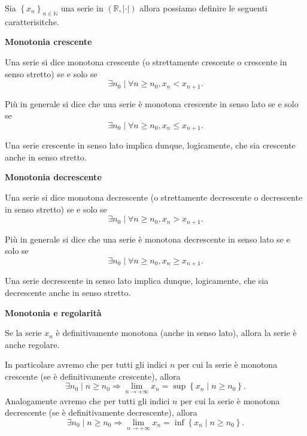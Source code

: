 Sia $\left\{x_n\right\}_{n\in\mathbb{N}}$ una serie in $\left(\mathbb{R},\left|\cdot\right|\right)$
allora possiamo definire le seguenti caratterisitche.


\begin{definition}
    \textbf{Monotonia crescente}

    Una serie si dice monotona crescente (o strettamente crescente o crescente in senso stretto)
    se e solo se
    \[
        \exists n_0 \mid \forall n \geq n_0, x_n<x_{n+1}.
    \]

    Più in generale si dice che una serie è monotona crescente in senso lato se e solo se
    \[
        \exists n_0 \mid \forall n \geq n_0, x_n\leq x_{n+1}.
    \]

    Una serie crescente in senso lato implica dunque, logicamente, che sia crescente
    anche in senso stretto.
\end{definition}

\begin{definition}
    \textbf{Monotonia decrescente}

    Una serie si dice monotona decrescente (o strettamente decrescente o decrescente in senso stretto)
    se e solo se
    \[
        \exists n_0 \mid \forall n \geq n_0, x_n>x_{n+1}.
    \]

    Più in generale si dice che una serie è monotona decrescente in senso lato se e solo se
    \[
        \exists n_0 \mid \forall n \geq n_0, x_n\geq x_{n+1}.
    \]

    Una serie decrescente in senso lato implica dunque, logicamente, che sia decrescente
    anche in senso stretto.
\end{definition}

\begin{theorem}\label{teo:mon-e-reg}
    \textbf{Monotonia e regolarità}

    Se la serie $x_n$ è definitivamente monotona (anche in senso lato), allora la serie è anche regolare.

    In particolare avremo che per tutti gli indici $n$ per cui la serie è
    monotona crescente (se è definitivamente crescente), allora
    \[
        \exists n_0 \mid n \geq n_0 \Rightarrow
        \underset{n\rightarrow+\infty}{\lim}x_n=\sup\left\{x_n\mid n \geq n_0\right\}.
    \]
    Analogamente avremo che per tutti gli indici $n$ per cui la serie è
    monotona decrescente (se è definitivamente decrescente), allora
    \[
        \exists n_0 \mid n \geq n_0 \Rightarrow
        \underset{n\rightarrow+\infty}{\lim}x_n=\inf\left\{x_n\mid n \geq n_0\right\}.
    \]
\end{theorem}

